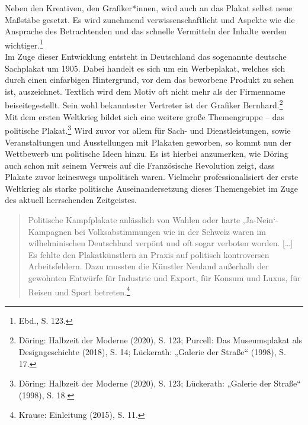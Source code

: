 \documentclass[a4paper,12pt,ngerman]{article}
\begin{document}
Neben den Kreativen, den Grafiker*innen, wird auch an das Plakat selbst neue Maßstäbe gesetzt. Es wird zunehmend verwissenschaftlicht und Aspekte wie die Ansprache des Betrachtenden und das schnelle Vermitteln der Inhalte werden wichtiger.\footnote{Ebd., S. 123.} \\
Im Zuge dieser Entwicklung entsteht in Deutschland das sogenannte deutsche Sachplakat um 1905. Dabei handelt es sich um ein Werbeplakat, welches sich durch einen einfarbigen Hintergrund, vor dem das beworbene Produkt zu sehen ist, auszeichnet. Textlich wird dem Motiv oft nicht mehr als der Firmenname beiseitegestellt. Sein wohl bekanntester Vertreter ist der Grafiker Bernhard.\footnote{Döring: Halbzeit der Moderne (2020), S. 123; Purcell: Das Museumsplakat als Designgeschichte (2018), S. 14; Lückerath: „Galerie der Straße“ (1998), S. 17.} \\
Mit dem ersten Weltkrieg bildet sich eine weitere große Themengruppe -- das politische Plakat.\footnote{Döring: Halbzeit der Moderne (2020), S. 123; Lückerath: „Galerie der Straße“ (1998), S. 18.}  Wird zuvor vor allem für Sach- und Dienstleistungen, sowie Veranstaltungen und Ausstellungen mit Plakaten geworben, so kommt nun der Wettbewerb um politische Ideen hinzu. Es ist hierbei anzumerken, wie Döring auch schon mit seinem Verweis auf die Französische Revolution zeigt, dass Plakate zuvor keineswegs unpolitisch waren. Vielmehr professionalisiert der erste Weltkrieg als starke politische Auseinandersetzung dieses Themengebiet im Zuge des aktuell herrschenden Zeitgeistes.

\blockquote{\fontsize{10pt}{12pt} \selectfont Politische Kampfplakate anlässlich von Wahlen oder harte ‚Ja-Nein‘-Kampagnen bei Volksabstimmungen wie in der Schweiz waren im wilhelminischen Deutschland verpönt und oft sogar verboten worden. […] Es fehlte den Plakatkünstlern an Praxis auf politisch kontroversen Arbeitsfeldern. Dazu mussten die Künstler Neuland außerhalb der gewohnten Entwürfe für Industrie und Export, für Konsum und Luxus, für Reisen und Sport betreten.\footnote{Krause: Einleitung (2015), S. 11.}}
\end{document}

